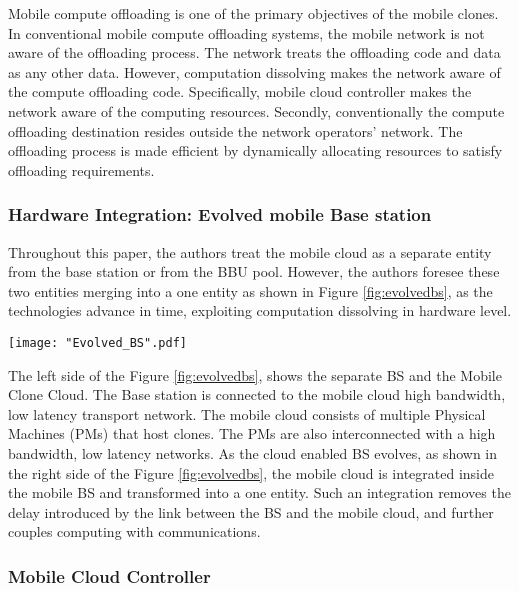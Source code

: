 \documentclass[12pt,journal,compsoc, onecolumn]{IEEEtran}
\begin{document}
Mobile compute offloading is one of the primary objectives of the mobile clones. In conventional mobile compute offloading systems, the mobile network is not aware of the offloading process. The network treats the offloading code and data as any other data. However, computation dissolving makes the network aware of the compute offloading code. Specifically, mobile cloud controller makes the network aware of the computing resources. Secondly, conventionally the compute offloading destination resides outside the network operators' network. The offloading process is made efficient by dynamically allocating resources to satisfy offloading requirements.

\subsubsection*{Hardware Integration: Evolved mobile Base station}

Throughout this paper, the authors treat the mobile cloud as a separate entity from the base station or from the BBU pool. However, the authors foresee these two entities merging into a one entity as shown in Figure \ref{fig:evolvedbs}, as the technologies advance in time, exploiting computation dissolving in hardware level. 

\begin{figure*}[ht]
\centering
\texttt{[image: "Evolved\_BS".pdf]}
\caption{\label{fig:evolvedbs} Computation Dissolving: Evolution of Clone enabled BS}
\end{figure*}

The left side of the Figure \ref{fig:evolvedbs}, shows the separate BS and the Mobile Clone Cloud. The Base station is connected to the mobile cloud high bandwidth, low latency transport network. The mobile cloud consists of multiple Physical Machines (PMs) that host clones. The PMs are also interconnected with a high bandwidth, low latency networks. As the cloud enabled BS evolves, as shown in the right side of the Figure \ref{fig:evolvedbs}, the mobile cloud is integrated inside the mobile BS and transformed into a one entity. Such an integration removes the delay introduced by the link between the BS and the mobile cloud, and further couples computing with communications. 

\subsubsection*{Mobile Cloud Controller}
\end{document}
